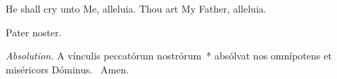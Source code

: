 {
\newcommand{\lessonwithhomily}[8][\normalsize]{
%
\colchunk{\dropcap{latin}{#2}

{

\centering{#3}

}

\dropcapnospace{latin}{#4} #5
} %
\colchunk{\dropcap[#1]{american}{#6}

{

\centering{#7}

}

\dropcapnospace{american}{#8}} \selectlanguage{latin}
}


  {
    \def\preant{\setgrefactor{17}\large}
    \def\prepsalm{\normalsize}
    \def\anttranslation{He shall cry unto Me, alleluia, Thou art My Father, alleluia.}
  }

  {
    \bigskip
    \def\preant{\setgrefactor{17}\large}
    \def\prepsalm{\normalsize}
    \def\anttranslation{Let the heavens rejoice, and let the earth be glad before the Lord, for He cometh.}
  }

  {
    \bigskip
    \def\preant{\setgrefactor{17}\large}
    \def\prepsalm{\normalsize}
    \def\anttranslation{The Lord hath made known, alleluia, His salvation, alleluia.}
  }

  \bigskip
  {
    {He shall cry unto Me, alleluia.}
    {Thou art My Father, alleluia.}
  }

  {
    {Pater noster.}

    \emph{Absolution.} A vínculis peccatórum nostrórum~* absólvat nos omnípotens et miséricors Dóminus. \Rbar{}~Amen.

}}
